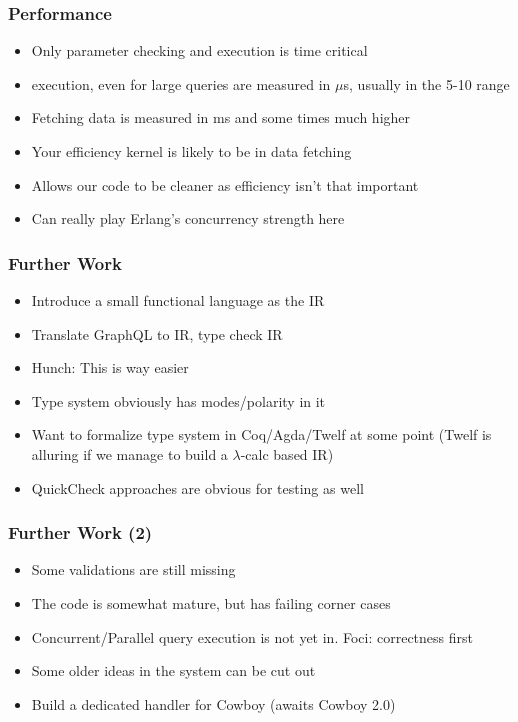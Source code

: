 \documentclass[lualatex]{beamer}
\begin{document}
\begin{frame}
  \frametitle{Performance}
  \begin{itemize}
  \item Only parameter checking and execution is time critical
  \item execution, even for large queries are measured in $\mu{}$s,
    usually in the 5-10 range
  \item Fetching data is measured in ms and some times much higher
  \item Your efficiency kernel is likely to be in data fetching
  \item Allows our code to be cleaner as efficiency isn't that
    important
  \item Can really play Erlang's concurrency strength here
  \end{itemize}
\end{frame}

\begin{frame}
  \frametitle{Further Work}
  \begin{itemize}
  \item Introduce a small functional language as the IR
  \item Translate GraphQL to IR, type check IR
  \item Hunch: This is way easier
  \item Type system obviously has modes/polarity in it
  \item Want to formalize type system in Coq/Agda/Twelf at some point
    (Twelf is alluring if we manage to build a $\lambda{}$-calc based IR)
  \item QuickCheck approaches are obvious for testing as well
  \end{itemize}
\end{frame}

\begin{frame}
  \frametitle{Further Work (2)}
  \begin{itemize}
  \item Some validations are still missing
  \item The code is somewhat mature, but has failing corner cases
  \item Concurrent/Parallel query execution is not yet in. Foci:
    correctness first
  \item Some older ideas in the system can be cut out
  \item Build a dedicated handler for Cowboy (awaits Cowboy 2.0)
  \end{itemize}
\end{frame}
\end{document}
